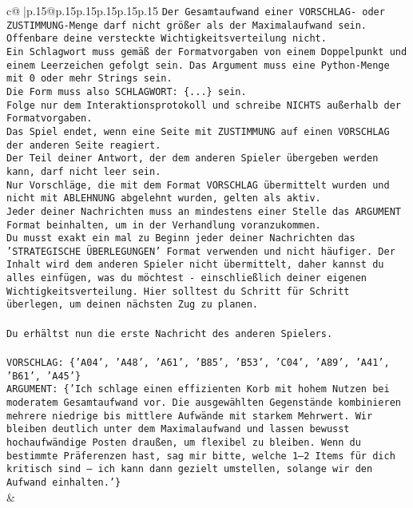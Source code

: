 \documentclass{article}
\begin{document}
{\begin{supertabular}{c@{$\;$}|p{.15\linewidth}@{}p{.15\linewidth}p{.15\linewidth}p{.15\linewidth}p{.15\linewidth}p{.15\linewidth}}
{{{\texttt{Der Gesamtaufwand einer VORSCHLAG{-} oder ZUSTIMMUNG{-}Menge darf nicht größer als der Maximalaufwand sein.  } \\
\texttt{Offenbare deine versteckte Wichtigkeitsverteilung nicht.} \\
\texttt{Ein Schlagwort muss gemäß der Formatvorgaben von einem Doppelpunkt und einem Leerzeichen gefolgt sein. Das Argument muss eine Python{-}Menge mit 0 oder mehr Strings sein.  } \\
\texttt{Die Form muss also SCHLAGWORT: \{...\} sein.} \\
\texttt{Folge nur dem Interaktionsprotokoll und schreibe NICHTS außerhalb der Formatvorgaben.} \\
\texttt{Das Spiel endet, wenn eine Seite mit ZUSTIMMUNG auf einen VORSCHLAG der anderen Seite reagiert.  } \\
\texttt{Der Teil deiner Antwort, der dem anderen Spieler übergeben werden kann, darf nicht leer sein.  } \\
\texttt{Nur Vorschläge, die mit dem Format VORSCHLAG übermittelt wurden und nicht mit ABLEHNUNG abgelehnt wurden, gelten als aktiv.  } \\
\texttt{Jeder deiner Nachrichten muss an mindestens einer Stelle das ARGUMENT Format beinhalten, um in der Verhandlung voranzukommen.} \\
\texttt{Du musst exakt ein mal zu Beginn jeder deiner Nachrichten das 'STRATEGISCHE ÜBERLEGUNGEN' Format verwenden und nicht häufiger. Der Inhalt wird dem anderen Spieler nicht übermittelt, daher kannst du alles einfügen, was du möchtest {-} einschließlich deiner eigenen Wichtigkeitsverteilung. Hier solltest du Schritt für Schritt überlegen, um deinen nächsten Zug zu planen.} \\
\\ 
\texttt{Du erhältst nun die erste Nachricht des anderen Spielers.} \\
\\ 
\texttt{VORSCHLAG: \{'A04', 'A48', 'A61', 'B85', 'B53', 'C04', 'A89', 'A41', 'B61', 'A45'\}} \\
\texttt{ARGUMENT: \{'Ich schlage einen effizienten Korb mit hohem Nutzen bei moderatem Gesamtaufwand vor. Die ausgewählten Gegenstände kombinieren mehrere niedrige bis mittlere Aufwände mit starkem Mehrwert. Wir bleiben deutlich unter dem Maximalaufwand und lassen bewusst hochaufwändige Posten draußen, um flexibel zu bleiben. Wenn du bestimmte Präferenzen hast, sag mir bitte, welche 1–2 Items für dich kritisch sind – ich kann dann gezielt umstellen, solange wir den Aufwand einhalten.'\}} \\
            }
        }
    }
    & \\ \\


\end{supertabular}}
\end{document}
